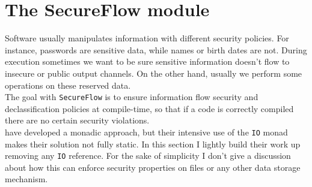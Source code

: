 \section{The SecureFlow module}\label{sec:flow}
Software usually manipulates information with different security policies. For instance, passwords are sensitive data, while names or birth dates are not. During execution sometimes we want to be sure sensitive information doesn't flow to insecure or public output channels. On the other hand, usually we perform some operations on these reserved data. \\
The goal with \texttt{SecureFlow} is to ensure information flow security and declassification policies at compile-time, so that if a code is correctly compiled there are no certain security violations. \\
\citeauthor{russo2008library} \cite{russo2008library} have developed a monadic approach, but their intensive use of the \texttt{IO} monad makes their solution not fully static. In this section I lightly build their work up removing any \texttt{IO} reference. For the sake of simplicity I don't give a discussion about how this can enforce security properties on files or any other data storage mechanism.

